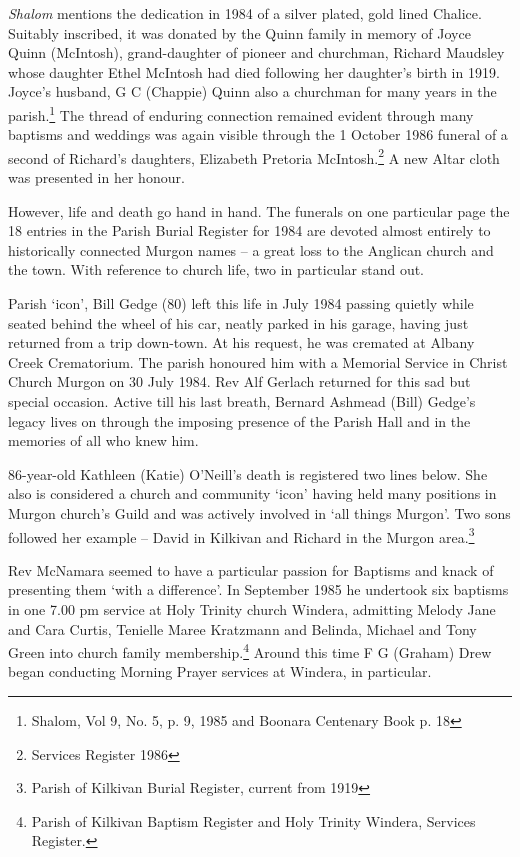 \emph{Shalom} mentions the dedication in 1984 of a silver plated, gold lined Chalice. Suitably inscribed, it was donated by the Quinn family in memory of Joyce Quinn (McIntosh), grand-daughter of pioneer and churchman, Richard Maudsley whose daughter Ethel McIntosh had died following her daughter's birth in 1919. Joyce's husband, G C (Chappie) Quinn also a churchman for many years in the parish.\footnote{Shalom, Vol 9, No. 5, p. 9, 1985 and Boonara Centenary Book p. 18} The thread of enduring connection remained evident through many baptisms and weddings was again visible through the 1 October 1986 funeral of a second of Richard's daughters, Elizabeth Pretoria McIntosh.\footnote{Services Register 1986} A new Altar cloth was presented in her honour.

However, life and death go hand in hand. The funerals on one particular page the 18 entries in the Parish Burial Register for 1984 are devoted almost entirely to historically connected Murgon names -- a great loss to the Anglican church and the town. With reference to church life, two in particular stand out.

Parish `icon', Bill Gedge (80) left this life in July 1984 passing quietly while seated behind the wheel of his car, neatly parked in his garage, having just returned from a trip down-town. At his request, he was cremated at Albany Creek Crematorium. The parish honoured him with a Memorial Service in Christ Church Murgon on 30 July 1984. Rev Alf Gerlach returned for this sad but special occasion. Active till his last breath, Bernard Ashmead (Bill) Gedge's legacy lives on through the imposing presence of the Parish Hall and in the memories of all who knew him.

86-year-old Kathleen (Katie) O'Neill's death is registered two lines below. She also is considered a church and community `icon' having held many positions in Murgon church's Guild and was actively involved in `all things Murgon'. Two sons followed her example -- David in Kilkivan and Richard in the Murgon area.\footnote{Parish of Kilkivan Burial Register, current from 1919}

Rev McNamara seemed to have a particular passion for Baptisms and knack of presenting them `with a difference'. In September 1985 he undertook six baptisms in one 7.00 pm service at Holy Trinity church Windera, admitting Melody Jane and Cara Curtis, Tenielle Maree Kratzmann and Belinda, Michael and Tony Green into church family membership.\footnote{Parish of Kilkivan Baptism Register and Holy Trinity Windera, Services Register.} Around this time F G (Graham) Drew began conducting Morning Prayer services at Windera, in particular.

